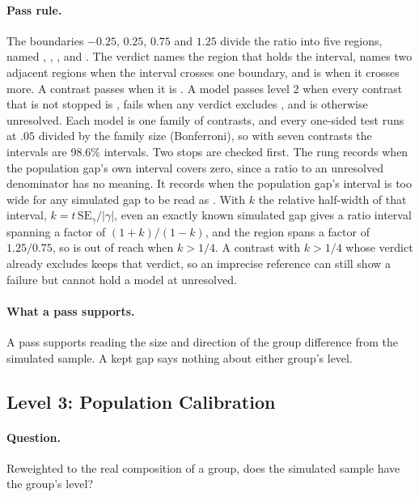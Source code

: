 \paragraph{Pass rule.}
The boundaries $-0.25$, $0.25$, $0.75$ and $1.25$ divide the ratio into five regions, named , , ,  and .
The verdict names the region that holds the interval, names two adjacent regions when the interval crosses one boundary, and is  when it crosses more.
A contrast passes when it is .
A model passes level 2 when every contrast that is not stopped is , fails when any verdict excludes , and is otherwise unresolved.
Each model is one family of contrasts, and every one-sided test runs at $.05$ divided by the family size (Bonferroni), so with seven contrasts the intervals are 98.6\% intervals.
Two stops are checked first.
The rung records  when the population gap's own interval covers zero, since a ratio to an unresolved denominator has no meaning.
It records  when the population gap's interval is too wide for any simulated gap to be read as .
With $k$ the relative half-width of that interval, $k = t\,\mathrm{SE}_\gamma / |\gamma|$, even an exactly known simulated gap gives a ratio interval spanning a factor of $(1+k)/(1-k)$, and the  region spans a factor of $1.25/0.75$, so  is out of reach when $k > 1/4$.
A contrast with $k > 1/4$ whose verdict already excludes  keeps that verdict, so an imprecise reference can still show a failure but cannot hold a model at unresolved.

\paragraph{What a pass supports.}
A pass supports reading the size and direction of the group difference from the simulated sample.
A kept gap says nothing about either group's level.

\subsection*{Level 3: Population Calibration}
\label{sec:s7-l3}

\paragraph{Question.}
Reweighted to the real composition of a group, does the simulated sample have the group's level?

